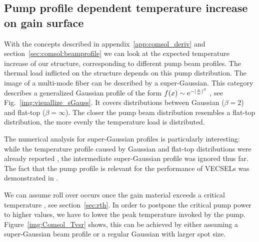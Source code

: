 \subsection{Pump profile dependent temperature increase on gain surface}

With the concepts described in
appendix~\ref{app:comsol_deriv}
and section~\ref{sec:comsol:beamprofile}
we can look at
the expected temperature increase
of our structure,
corresponding to different pump beam profiles.
The thermal load
inflicted on the structure
depends on this pump distribution.
The image of a multi-mode fiber
can be described by a super-Gaussian.
This category describes
a generalized Gaussian profile
of the form $f(x)\sim\mathrm{e}^{-|\frac{x}{w}|^\beta}$
\cite{Chernikov2010},
see Fig.~\ref{img:visuallize_sGauss}.
It covers
distributions between
Gaussian ($\beta=2$) and flat-top ($\beta=\infty$).
The closer the pump beam distribution
resembles a flat-top distribution,
the more evenly the temperature load
is distributed.

The numerical analysis
for super-Gaussian profiles
is particularly interesting:
while the temperature profile
caused by Gaussian and flat-top distributions
were already reported \cite{Kemp2005},
the intermediate super-Gaussian profile
was ignored thus far.
The fact that
the pump profile
is relevant
for the performance of VECSELs
was demonstrated in \cite{Chernikov2010}.

We can assume roll over occurs
once the gain material exceeds
a critical temperature \cite{Heinen2012},
see section~\ref{sec:rth}.
In order to postpone
the critical pump power
to higher values,
we have to lower the peak temperature
invoked by the pump.
Figure~\ref{img:Comsol_Tvsr} shows,
this can be achieved
by either assuming
a super-Gaussian beam profile
or a regular Gaussian
with larger spot size.

